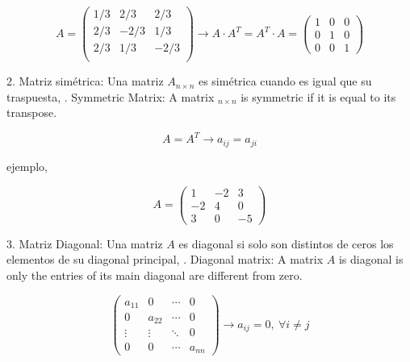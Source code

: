 \begin{equation*}
A=\begin{pmatrix}
1/3& 2/3& 2/3\\
2/3& -2/3& 1/3\\
2/3& 1/3& -2/3\\
\end{pmatrix} \rightarrow A\cdot A^T =A^T\cdot A= \begin{pmatrix}
1& 0& 0\\
0& 1& 0\\
0& 0& 1
\end{pmatrix}
\end{equation*}
\begin{paracol}{2}
2. Matriz simétrica: Una matriz $A_{n\times n}$ es simétrica cuando es igual que su traspuesta,
. Symmetric Matrix: A matrix $_{n\times n}$ is symmetric if it is equal to its transpose.
\end{paracol}
\begin{equation*}
A=A^T \rightarrow a_{ij}=a_{ji}
\end{equation*}
\begin{paracol}{2}
ejemplo,
\end{paracol}
\begin{equation*}
A=\begin{pmatrix}
1& -2& 3\\
-2& 4& 0\\
3& 0& -5
\end{pmatrix}
\end{equation*}
\begin{paracol}{2}
3. Matriz Diagonal: Una matriz $A$  es diagonal si solo son distintos de ceros los elementos de su diagonal principal,
. Diagonal matrix: A matrix $A$ is diagonal is only the entries of its main diagonal are different from zero.
\end{paracol}

\begin{equation*}
\begin{pmatrix}
a_{11}& 0& \cdots & 0\\
0& a_{22}& \cdots & 0\\
\vdots & \vdots & \ddots & 0\\
0& 0& \cdots & a_{nn}
\end{pmatrix} \rightarrow
a_{ij}=0,\ \forall i\neq j
\end{equation*}

